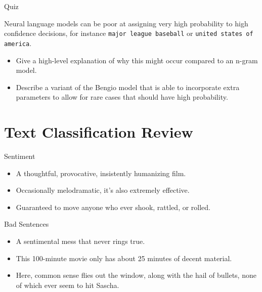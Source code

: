 \documentclass{beamer}
\begin{document}
\begin{frame}{Quiz}

Neural language models can be poor at assigning very high probability
to high confidence decisions, for instance \texttt{major league baseball}
or \texttt{united states of america}. 

\air 

\begin{itemize}
\item Give a high-level explanation of why this might occur compared to an n-gram 
model.
\item  Describe a variant of the Bengio model that is able to incorporate extra parameters 
to allow for rare cases that should have high probability.  
\end{itemize}
\end{frame}


\section{Text Classification Review}


\begin{frame}{Sentiment}
  \begin{itemize}
  \item   A thoughtful, provocative, insistently humanizing film. 
  \item   Occasionally melodramatic, it's also extremely effective.
    \item   Guaranteed to move anyone who ever shook, rattled, or rolled.   
  \end{itemize}

  \alert{Bad Sentences}
  \begin{itemize}
  \item A sentimental mess that never rings true.  
  \item This 100-minute movie only has about 25 minutes of decent material.
  \item Here, common sense flies out the window, along with the hail of
    bullets, none of which ever seem to hit Sascha.
  \end{itemize}
\end{frame}
\end{document}

